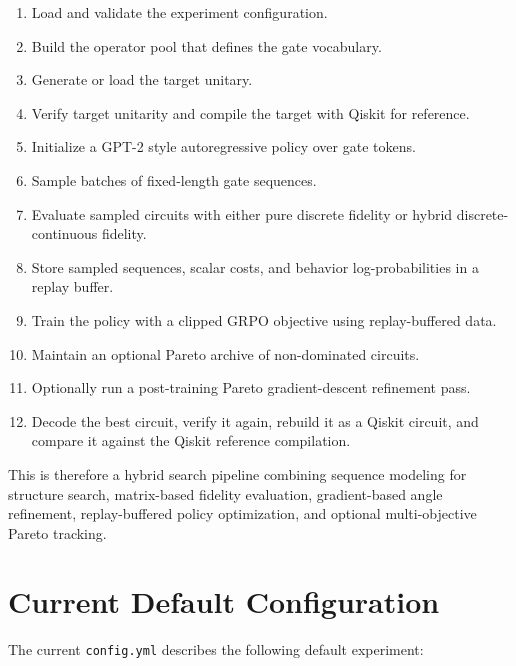 \documentclass[11pt]{article}
\begin{document}
\begin{enumerate}[leftmargin=*]
\item Load and validate the experiment configuration.
\item Build the operator pool that defines the gate vocabulary.
\item Generate or load the target unitary.
\item Verify target unitarity and compile the target with Qiskit for reference.
\item Initialize a GPT-2 style autoregressive policy over gate tokens.
\item Sample batches of fixed-length gate sequences.
\item Evaluate sampled circuits with either pure discrete fidelity or hybrid discrete-continuous fidelity.
\item Store sampled sequences, scalar costs, and behavior log-probabilities in a replay buffer.
\item Train the policy with a clipped GRPO objective using replay-buffered data.
\item Maintain an optional Pareto archive of non-dominated circuits.
\item Optionally run a post-training Pareto gradient-descent refinement pass.
\item Decode the best circuit, verify it again, rebuild it as a Qiskit circuit, and compare it against the Qiskit reference compilation.
\end{enumerate}

This is therefore a hybrid search pipeline combining sequence modeling for structure search, matrix-based fidelity evaluation, gradient-based angle refinement, replay-buffered policy optimization, and optional multi-objective Pareto tracking.

\section{Current Default Configuration}

The current \texttt{config.yml} describes the following default experiment:
\end{document}
